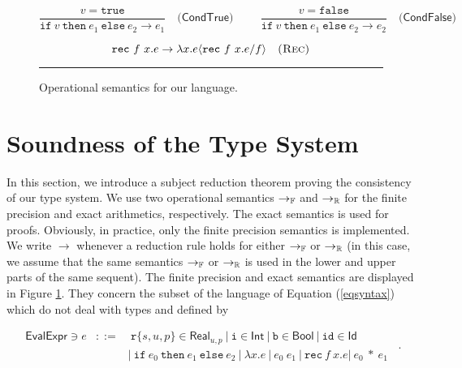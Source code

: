\begin{figure}[tb]
$$
\frac{v=\mathtt{true}}
     {\mathtt{if}\ v\ \mathtt{then}\ e_1\ \mathtt{else}\ e_2
      \rightarrow  e_1
     }\quad\textsf{(CondTrue)}
\hspace{1cm}
\frac{v=\mathtt{false}}
     {\mathtt{if}\ v\ \mathtt{then}\ e_1\ \mathtt{else}\ e_2
      \rightarrow  e_2
     }\quad\textsf{(CondFalse)}
$$

$$
     {\mathtt{rec}\ f\ x.e} \rightarrow \lambda x.e\langle \mathtt{rec}\ f\ x.e/f\rangle \quad\textsc{(Rec)}
$$

\vspace{0.1cm}
\hrule
\caption{\label{figsem}Operational semantics for our language.} 
\end{figure}


\section{Soundness of the Type System}
\label{correct}

In this section, we introduce a subject reduction theorem proving the consistency of our type system.
We use two operational semantics $\rightarrow_{\mathbb{F}}$ and $\rightarrow_{\mathbb{R}}$ for the finite precision
and exact arithmetics, respectively. 
The exact semantics is used for proofs. Obviously, in practice, only
the finite precision semantics is implemented.
We write $\rightarrow$ whenever a reduction rule holds for either
$\rightarrow_{\mathbb{F}}$ or $\rightarrow_{\mathbb{R}}$ (in this case, we assume that the same semantics $\rightarrow_{\mathbb{F}}$
or $\rightarrow_{\mathbb{R}}$ is used in the lower and upper parts of the same sequent).
The finite precision and exact semantics are  
displayed in Figure \ref{figsem}.
They concern the subset of the language of Equation (\ref{eqsyntax}) which do not deal with types
and defined by
 
\begin{equation}
\label{eqsyntax2}
\begin{array}{rcl}
\mathsf{EvalExpr}\ni e&::=&\ \mathtt{r}\{s,u,p\}\in \mathsf{Real}_{u,p}\ |\ \mathtt{i}\in \mathsf{Int}
\ |\ \mathtt{b}\in \mathsf{Bool}\ |\ \mathtt{id}\in\mathsf{Id} \\
&&|\  \mathtt{if}\ e_0\ \mathtt{then}\ e_1\ \mathtt{else}\ e_2
\ |\ \lambda x.e
\ |\ e_0\ e_1\ |\ \mathtt{rec}\ f\ x.e
|\ e_0\ \ast\ e_1
\end{array}\enspace .
\end{equation}

